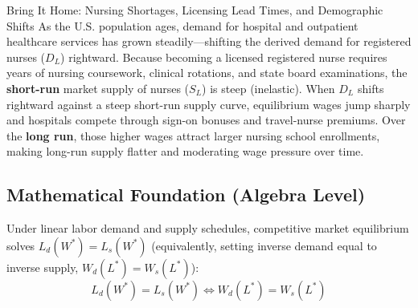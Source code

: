 \documentclass[11pt,letterpaper]{article}
\begin{document}
\begin{examplecase}{Bring It Home: Nursing Shortages, Licensing Lead Times, and Demographic Shifts}
As the U.S. population ages, demand for hospital and outpatient healthcare services has grown steadily---shifting the derived demand for registered nurses ($D_L$) rightward. Because becoming a licensed registered nurse requires years of nursing coursework, clinical rotations, and state board examinations, the \textbf{short-run} market supply of nurses ($S_L$) is steep (inelastic). When $D_L$ shifts rightward against a steep short-run supply curve, equilibrium wages jump sharply and hospitals compete through sign-on bonuses and travel-nurse premiums. Over the \textbf{long run}, those higher wages attract larger nursing school enrollments, making long-run supply flatter and moderating wage pressure over time.
\end{examplecase}

\subsection*{Mathematical Foundation (Algebra Level)}
Under linear labor demand and supply schedules, competitive market equilibrium solves $L_d(W^*) = L_s(W^*)$ (equivalently, setting inverse demand equal to inverse supply, $W_d(L^*) = W_s(L^*)$):
\begin{equation}
L_d(W^*) = L_s(W^*) \iff W_d(L^*) = W_s(L^*)
\end{equation}
\end{document}
